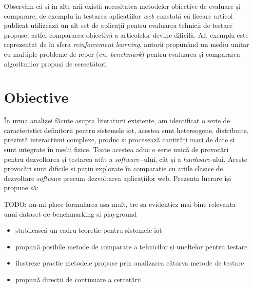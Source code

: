 Observăm că și în alte arii există necesitatea metodelor obiective de evaluare și comparare, de exemplu în testarea aplicațiilor \textit{web} \cite{Garousi2013} constată că fiecare articol publicat utilizează un alt set de aplicații pentru evaluarea tehnicii de testare propuse, astfel compararea obiectivă a articolelor devine dificilă. Alt exemplu este reprezentat de \cite{Brockman2016} în sfera \textit{reinforcement learning}, autorii propunând un mediu unitar cu multiple probleme de reper (\textit{en. benchmark}) pentru evaluarea și compararea algoritmilor propuși de cercetători.

\section{Obiective}

În urma analizei făcute asupra literaturii existente, am identificat o serie de caracteristici definitorii pentru sistemele \acrlong{iot}, acestea sunt hetereogene, distribuite, prezintă interacțiuni complexe, produc și procesează cantități mari de date și sunt integrate în medii fizice. Toate acestea aduc o serie unică de provocări pentru dezvoltarea și testarea atât a \textit{software-}-ului, cât și a \textit{hardware}-ului. Aceste provocări sunt dificile și puțin explorate în comparație cu ariile clasice de dezvoltare \textit{software} precum dezvoltarea aplicațiilor web. Prezenta lucrare își propune să:

TODO: nu-mi place formularea asa mult, tre sa evidentiez mai bine relevanta unui dataset de benchmarking si playground

\begin{itemize}
    \item stabilească un cadru teoretic pentru sistemele \acrlong{iot}
    \item propună posibile metode de comparare a tehnicilor și uneltelor pentru testare
    \item ilustreze practic metodele propuse prin analizarea câtorva metode de testare
    \item propună direcții de continuare a cercetării
\end{itemize}
